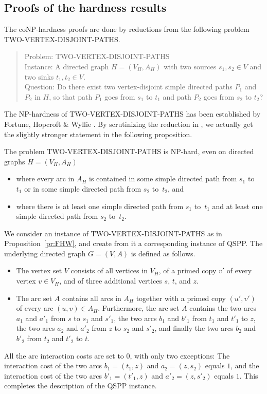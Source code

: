 \documentclass[runningheads]{llncs}
\begin{document}
\begin{appendix}
\section{Proofs of the hardness results}
\label{sec:hard-appendix}
The coNP-hardness proofs are done by reductions from the following problem TWO-VERTEX-DISJOINT-PATHS.
\begin{quote}
Problem: TWO-VERTEX-DISJOINT-PATHS
\\[1.0ex]
Instance: A directed graph $H=(V_H,A_H)$ with two sources $s_1,s_2\in V$ and two sinks $t_1,t_2\in V$.
\\[1.0ex]
Question: Do there exist two vertex-disjoint simple directed paths $P_1$ and $P_2$ in $H$,
so that path $P_1$ goes from $s_1$ to $t_1$ and path $P_2$ goes from $s_2$ to $t_2$?
\end{quote}
The NP-hardness of TWO-VERTEX-DISJOINT-PATHS has been established by Fortune, Hopcroft \& Wyllie \cite{FoHoWy1980}.
By scrutinizing the reduction in \cite{FoHoWy1980}, we actually get the slightly stronger statement
in the following proposition.
\begin{proposition}
\label{pr:FHW}
\cite{FoHoWy1980}
The problem TWO-VERTEX-DIS\-JOINT-PATHS is NP-hard, even on directed graphs $H=(V_H,A_H)$
\begin{itemize}
\item where every arc in $A_H$ is contained in some simple directed path from $s_1$ to~$t_1$
or in some simple directed path from $s_2$ to~$t_2$, and
\item where there is at least one simple directed path from $s_1$ to~$t_1$
and at least one simple directed path from $s_2$ to~$t_2$.
\end{itemize}
\end{proposition}

We consider an instance of TWO-VERTEX-DISJOINT-PATHS as in Proposition~\ref{pr:FHW},
and create from it a corresponding instance of QSPP.
The underlying directed graph $G=(V,A)$ is defined as follows.
\begin{itemize}
\item The vertex set $V$ consists of all vertices in $V_H$, of a primed copy $v'$ of every
vertex $v\in V_H$, and of three additional vertices $s$, $t$, and $z$.
\item The arc set $A$ contains all arcs in $A_H$ together with a primed copy $(u',v')$
of every arc $(u,v)\in A_H$.
Furthermore, the arc set $A$ contains
the two arcs $a_1$ and $a'_1$ from $s$ to $s_1$ and $s'_1$,
the two arcs $b_1$ and $b'_1$ from $t_1$ and $t'_1$ to $z$,
the two arcs $a_2$ and $a'_2$ from $z$ to $s_2$ and $s'_2$, and finally
the two arcs $b_2$ and $b'_2$ from $t_2$ and $t'_2$ to $t$.
\end{itemize}
All the arc interaction costs are set to $0$, with only two exceptions:
The interaction cost of the two arcs $b_1=(t_1,z)$ and $a_2=(z,s_2)$ equals $1$, and
the interaction cost of the two arcs $b'_1=(t'_1,z)$ and $a'_2=(z,s'_2)$ equals $1$.
This completes the description of the QSPP instance.


\end{appendix}
\end{document}
